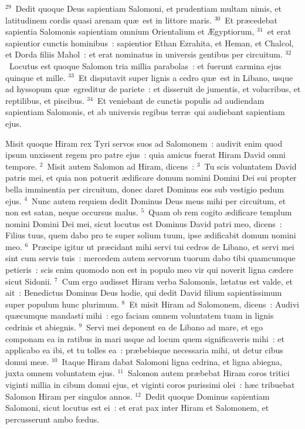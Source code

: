 ${}^{29}$~Dedit quoque Deus sapientiam Salomoni, et prudentiam multam nimis, et latitudinem cordis quasi arenam qu\ae\ est in littore maris.
${}^{30}$~Et pr\ae cedebat sapientia Salomonis sapientiam omnium Orientalium et \AE gyptiorum,
${}^{31}$~et erat sapientior cunctis hominibus~: sapientior Ethan Ezrahita, et Heman, et Chalcol, et Dorda filiis Mahol~: et erat nominatus in universis gentibus per circuitum.
${}^{32}$~Locutus est quoque Salomon tria millia parabolas~: et fuerunt carmina ejus quinque et mille.
${}^{33}$~Et disputavit super lignis a cedro qu\ae\ est in Libano, usque ad hyssopum qu\ae\ egreditur de pariete~: et disseruit de jumentis, et volucribus, et reptilibus, et piscibus.
${}^{34}$~Et veniebant de cunctis populis ad audiendam sapientiam Salomonis, et ab universis regibus terr\ae\ qui audiebant sapientiam ejus.

\bchapter
\lettrine[lines=3,image=true,loversize=0.05,lraise=-0.03]{M}{}isit quoque Hiram rex Tyri servos suos ad Salomonem~: audivit enim quod ipsum unxissent regem pro patre ejus~: quia amicus fuerat Hiram David omni tempore.
${}^{2}$~Misit autem Salomon ad Hiram, dicens~:
${}^{3}$~Tu scis voluntatem David patris mei, et quia non potuerit \ae dificare domum nomini Domini Dei sui propter bella imminentia per circuitum, donec daret Dominus eos sub vestigio pedum ejus.
${}^{4}$~Nunc autem requiem dedit Dominus Deus meus mihi per circuitum, et non est satan, neque occursus malus.
${}^{5}$~Quam ob rem cogito \ae dificare templum nomini Domini Dei mei, sicut locutus est Dominus David patri meo, dicens~: Filius tuus, quem dabo pro te super solium tuum, ipse \ae dificabit domum nomini meo.
${}^{6}$~Pr\ae cipe igitur ut pr\ae cidant mihi servi tui cedros de Libano, et servi mei sint cum servis tuis~: mercedem autem servorum tuorum dabo tibi quamcumque petieris~: scis enim quomodo non est in populo meo vir qui noverit ligna c\ae dere sicut Sidonii.
${}^{7}$~Cum ergo audisset Hiram verba Salomonis, l\ae tatus est valde, et ait~: Benedictus Dominus Deus hodie, qui dedit David filium sapientissimum super populum hunc plurimum.
${}^{8}$~Et misit Hiram ad Salomonem, dicens~: Audivi qu\ae cumque mandasti mihi~: ego faciam omnem voluntatem tuam in lignis cedrinis et abiegnis.
${}^{9}$~Servi mei deponent ea de Libano ad mare, et ego componam ea in ratibus in mari usque ad locum quem significaveris mihi~: et applicabo ea ibi, et tu tolles ea~: pr\ae bebisque necessaria mihi, ut detur cibus domui me\ae .
${}^{10}$~Itaque Hiram dabat Salomoni ligna cedrina, et ligna abiegna, juxta omnem voluntatem ejus.
${}^{11}$~Salomon autem pr\ae bebat Hiram coros tritici viginti millia in cibum domui ejus, et viginti coros purissimi olei~: h\ae c tribuebat Salomon Hiram per singulos annos.
${}^{12}$~Dedit quoque Dominus sapientiam Salomoni, sicut locutus est ei~: et erat pax inter Hiram et Salomonem, et percusserunt ambo fœdus.


